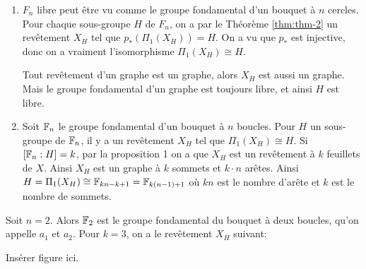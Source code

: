    \begin{preuve}
     \begin{enumerate}
     \item $F_n$ libre peut être vu comme le groupe fondamental d'un bouquet à $n$ cercles. Pour chaque
       sous-groupe $H$ de $F_n$, on a par le Théorème \ref{thm:thm-2} un revêtement $X_H$ tel que
       $p_\ast(\Pi_1(X_H)) = H$. On a vu que $p_\ast$ est injective, donc on a vraiment l'isomorphisme
       $\Pi_1(X_H) \cong H$.

       Tout revêtement d'un graphe est un graphe, alors $X_H$ est aussi un graphe. Mais le groupe fondamental
       d'un graphe est toujours libre, et ainsi $H$ est libre.


     \item Soit $\mathbb{F}_n$ le groupe fondamental d'un bouquet à $n$ boucles. Pour $H$ un sous-groupe de $\mathbb{F}_n$, il
       y a un revêtement $X_H$ tel que $\Pi_1(X_H) \cong H$. Si $[\mathbb{F}_n : H] = k$, par la proposition 1 on a
       que $X_H$ est un revêtement à $k$ feuillets de $X$.
       Ainsi $X_H$ est un graphe à $k$ sommets et $k\cdot n$ arêtes. Ainsi $H = \Pi_1(X_H) \cong \mathbb{F}_{kn-k+1} =
       \mathbb{F}_{k(n-1)+1}$
       où $kn$ est le nombre d'arête et $k$ est le nombre de sommets.
     \end{enumerate}
   \end{preuve}

   \begin{ex}
     Soit $n=2$. Alors $\mathbb{F}_2$ est le groupe fondamental du bouquet à deux boucles, qu'on appelle $a_1$ et
     $a_2$. Pour $k = 3$, on a le revêtement $X_H$ suivant:
     \begin{center}
       Insérer figure ici.
     \end{center}
   \end{ex}

    
    
    


    
      
  




